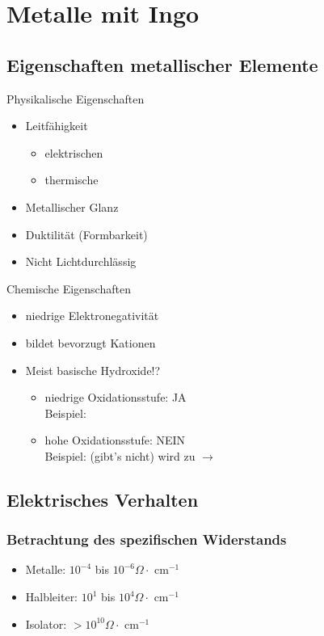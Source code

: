 \documentclass{article}
\begin{document}
\tableofcontents
\newpage
\section{Metalle mit Ingo}
\subsection{Eigenschaften metallischer Elemente}
Physikalische Eigenschaften
\begin{itemize}
    \item Leitfähigkeit
    \begin{itemize}
        \item elektrischen
        \item thermische
    \end{itemize}
    \item Metallischer Glanz
    \item Duktilität (Formbarkeit)
    \item Nicht Lichtdurchlässig
\end{itemize}
Chemische Eigenschaften
\begin{itemize}
    \item niedrige Elektronegativität
    \item bildet bevorzugt Kationen
    \item Meist basische Hydroxide!?
    \begin{itemize}
        \item niedrige Oxidationsstufe: JA \\Beispiel: 
        \item hohe Oxidationsstufe: NEIN \\Beispiel:  (gibt's nicht) wird zu  $\rightarrow$\\ 
    \end{itemize}
\end{itemize}
\subsection{Elektrisches Verhalten}
\subsubsection{Betrachtung des spezifischen Widerstands}
\begin{itemize}
    \item Metalle: $10^{-4}$ bis $10^{-6} \Omega\cdot$ cm$^{-1}$
    \item Halbleiter: $10^{1}$ bis $10^{4} \Omega\cdot$ cm$^{-1}$
    \item Isolator: $> 10^{10} \Omega\cdot$ cm$^{-1}$
\end{itemize}
\end{document}
